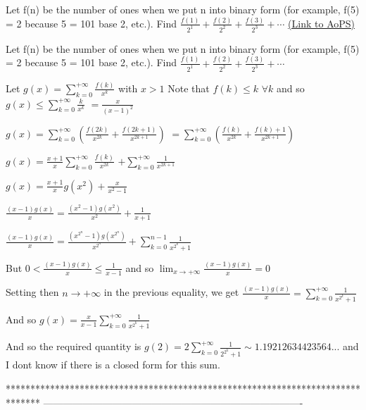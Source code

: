 \begin{problem}
	Let f(n) be the number of ones when we put n into binary form (for example, f(5) = 2 because 5 = 101 base 2, etc.). Find $\frac{f(1)}{2^1} + \frac{f(2)}{2^2} + \frac{f(3)}{2^3} +\cdots$
	\flushright \href{https://artofproblemsolving.com/community/c6h472207}{(Link to AoPS)}
\end{problem}



\begin{solution}
	\begin{tcolorbox}Let f(n) be the number of ones when we put n into binary form (for example, f(5) = 2 because 5 = 101 base 2, etc.). Find $\frac{f(1)}{2^1} + \frac{f(2)}{2^2} + \frac{f(3)}{2^3} +\cdots$\end{tcolorbox}
Let $g(x)=\sum_{k=0}^{+\infty}\frac{f(k)}{x^k}$ with $x>1$
Note that $f(k)\le k$ $\forall k$ and so $g(x)\le \sum_{k=0}^{+\infty}\frac{k}{x^k}$ $=\frac x{(x-1)^2}$

$g(x)=\sum_{k=0}^{+\infty}\left(\frac{f(2k)}{x^{2k}}+\frac{f(2k+1)}{x^{2k+1}}\right)$ $=\sum_{k=0}^{+\infty}\left(\frac{f(k)}{x^{2k}}+\frac{f(k)+1}{x^{2k+1}}\right)$

$g(x)=\frac{x+1}x\sum_{k=0}^{+\infty}\frac{f(k)}{x^{2k}}$ $+\sum_{k=0}^{+\infty}\frac{1}{x^{2k+1}}$

$g(x)=\frac{x+1}xg(x^2)+\frac x{x^2-1}$

$\frac{(x-1)g(x)}x=\frac{(x^2-1)g(x^2)}{x^2}+\frac 1{x+1}$

$\frac{(x-1)g(x)}x=\frac{(x^{2^n}-1)g(x^{2^n})}{x^{2^n}}+\sum_{k=0}^{n-1}\frac 1{x^{2^k}+1}$

But $0<\frac{(x-1)g(x)}x\le\frac 1{x-1}$ and so $\lim_{x\to+\infty}\frac{(x-1)g(x)}x=0$

Setting then $n\to+\infty$ in the previous equality, we get $\frac{(x-1)g(x)}x=\sum_{k=0}^{+\infty}\frac 1{x^{2^k}+1}$

And so $g(x)=\frac x{x-1}\sum_{k=0}^{+\infty}\frac 1{x^{2^k}+1}$

And so the required quantity is $g(2)=\boxed{2\sum_{k=0}^{+\infty}\frac 1{2^{2^k}+1}\sim 1.19212634423564...}$ and I dont know if there is a closed form for this sum.
\end{solution}
*******************************************************************************
-------------------------------------------------------------------------------

